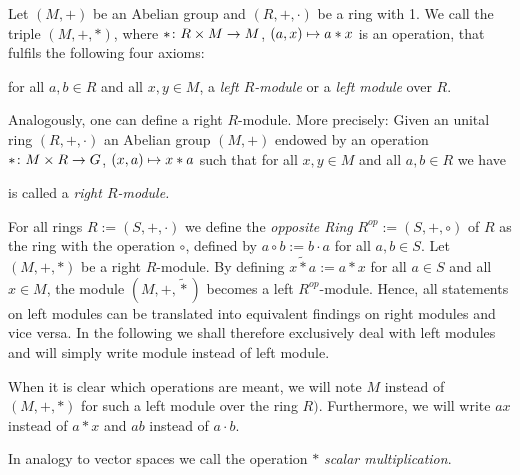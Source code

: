 \begin{defin} Let $(M,+)$ be an Abelian group and $(R,+,\cdot)$ be a ring with 1. We call the triple $(M,+,\ast)$, where $\ast\colon R\times M\rightarrow M$, $(a,x)\mapsto a\ast x$ is an operation, that fulfils the following four axioms:
\begin{multienumerate}
\end{multienumerate}
for all $a,b \in R$ and all $x,y \in M$, a \emph{left $R$-module} or a \textit{left module} over $R$.
\end{defin}

Analogously, one can define a right $R$-module. More precisely: Given an unital ring $(R,+,\cdot)$ an Abelian group $(M,+)$ endowed by an operation $\ast\colon M \times R \rightarrow G$, $(x,a)\mapsto x\ast a$ such that for all $x,y\in M$ and all $a,b\in R$ we have
\begin{multienumerate}
\end{multienumerate}
is called a \emph{right $R$-module.}

\begin{rem}
\begin{exlist}
\item For all rings $R:=(S,+,\cdot)$ we define the \textit{opposite Ring} $R^{op}:=(S,+,\circ)$ of $R$ as the ring with the operation $\circ$, defined by $a\circ b:= b\cdot a$ for all $a,b \in S$. Let $(M,+,\ast)$ be a right $R$-module.
By defining $x\tilde{\ast}a:=a\ast x$ for all $a\in S$ and all $x\in M$, the module $(M,+,\tilde{\ast})$ becomes a left $R^{op}$-module.
Hence, all statements on left modules can be translated into equivalent findings on right modules and vice versa.
In the following we shall therefore exclusively deal with left modules and will simply write module instead of left module.
\item When it is clear which operations are meant, we will note $M$ instead of $(M,+,\ast)$ for such a left module over the ring $R)$.
Furthermore, we will write $ax$ instead of $a\ast x$ and $ab$ instead of $a\cdot b$.
\item In analogy to vector spaces we call the operation $\ast$ \emph{scalar multiplication}.
\end{exlist}
\end{rem}

